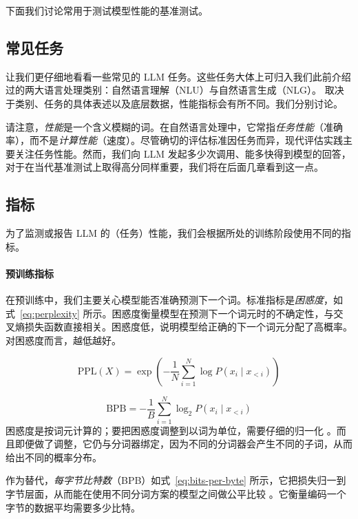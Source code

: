 下面我们讨论常用于测试模型性能的基准测试。

\subsection{常见任务}
让我们更仔细地看看一些常见的 LLM 任务。这些任务大体上可归入我们此前介绍过的两大语言处理类别：自然语言理解（NLU）与自然语言生成（NLG）。
取决于类别、任务的具体表述以及底层数据，性能指标会有所不同。我们分别讨论。

请注意，{\em 性能}是一个含义模糊的词。在自然语言处理中，它常指\emph{任务性能}（准确率），而不是\emph{计算性能}（速度）。尽管确切的评估标准因任务而异，现代评估实践主要关注任务性能。然而，我们向 LLM 发起多少次调用、能多快得到模型的回答，对于在当代基准测试上取得高分同样重要，我们将在后面几章看到这一点。


\subsection{指标}\label{sec:metrics}
为了监测或报告 LLM 的（任务）性能，我们会根据所处的训练阶段使用不同的指标。

\paragraph{预训练指标}
在预训练中，我们主要关心模型能否准确预测下一个词。标准指标是{\em 困惑度}，如式~\ref{eq:perplexity} 所示。困惑度衡量模型在预测下一个词元时的不确定性，与交叉熵损失函数直接相关。困惑度低，说明模型给正确的下一个词元分配了高概率。对困惑度而言，越低越好。

\begin{equation}
    \text{PPL}(X) = \exp \left( - \frac{1}{N} \sum_{i=1}^N \log P(x_i \mid x_{<i}) \right)
    \label{eq:perplexity}
\end{equation}

\begin{equation}
    \text{BPB} = - \frac{1}{B} \sum_{i=1}^N \log_2 P(x_i \mid x_{<i})
    \label{eq:bits-per-byte}
\end{equation}
困惑度是按词元计算的；要把困惑度调整到以词为单位，需要仔细的归一化 \citep{pimentel-meister-2024-compute}。而且即便做了调整，它仍与分词器绑定，因为不同的分词器会产生不同的子词，从而给出不同的概率分布。

作为替代，\emph{每字节比特数}（BPB）如式~\ref{eq:bits-per-byte} 所示，它把损失归一到字节层面，从而能在使用不同分词方案的模型之间做公平比较 \citep{borgeaud2022improving}。它衡量编码一个字节的数据平均需要多少比特。

